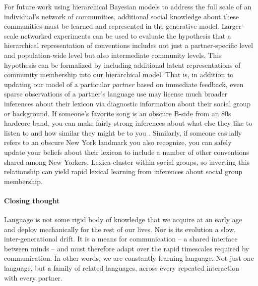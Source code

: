 For future work using hierarchical Bayesian models to address the full scale of an individual's  network of communities, additional social knowledge about these communities must be learned and represented in the generative model.
Larger-scale networked experiments can be used to evaluate the hypothesis that a hierarchical representation of conventions includes not just a partner-specific level and population-wide level but also intermediate community levels. 
This hypothesis can be formalized by including additional latent representations of community membership into our hierarchical model.
That is, in addition to updating our model of a particular \emph{partner} based on immediate feedback, even sparse observations of a partner's language use may license much broader inferences about their lexicon via diagnostic information about their social group or background. 
If someone's favorite song is an obscure B-side from an 80s hardcore band, you can make fairly strong inferences about what else they like to listen to and how similar they might be to you \cite{VelezEtAl16_Overlaps, GershmanEtAl17_StructureSocialInfluence}. 
Similarly, if someone casually refers to an obscure New York landmark you also recognize, you can safely update your beliefs about their lexicon to include a number of other conventions shared among New Yorkers. 
Lexica cluster within social groups, so inverting this relationship can yield rapid lexical learning from inferences about social group membership.

\paragraph{Closing thought}

Language is not some rigid body of knowledge that we acquire at an early age and deploy mechanically for the rest of our lives. 
Nor is its evolution a slow, inter-generational drift. 
It is a means for communication -- a shared interface between minds -- and must therefore adapt over the rapid timescales required by communication. 
In other words, we are constantly learning language. 
Not just one language, but a family of related languages, across every repeated interaction with every partner. 


